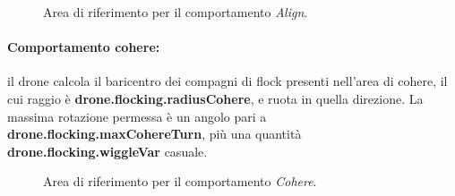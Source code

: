 \begin{figure}[H] 
    \captionsetup{justification=centering, margin=2cm, font=footnotesize}
    \begin{center}
    \end{center}
    \caption{Area di riferimento per il comportamento \textit{Align}.}
    \label{align}
\end{figure}

\paragraph{Comportamento cohere:} il drone calcola il baricentro dei compagni di flock presenti nell'area di cohere, il cui raggio è \textbf{drone.flocking.radiusCohere}, e ruota in quella direzione.
La massima rotazione permessa è un angolo pari a \textbf{drone.flocking.maxCohereTurn}, più una quantità \textbf{drone.flocking.wiggleVar} casuale.

\begin{figure}[H] 
    \captionsetup{justification=centering, margin=2cm, font=footnotesize}
    \begin{center}
    \end{center}
    \caption{Area di riferimento per il comportamento \textit{Cohere}.}
    \label{cohere}
\end{figure}

